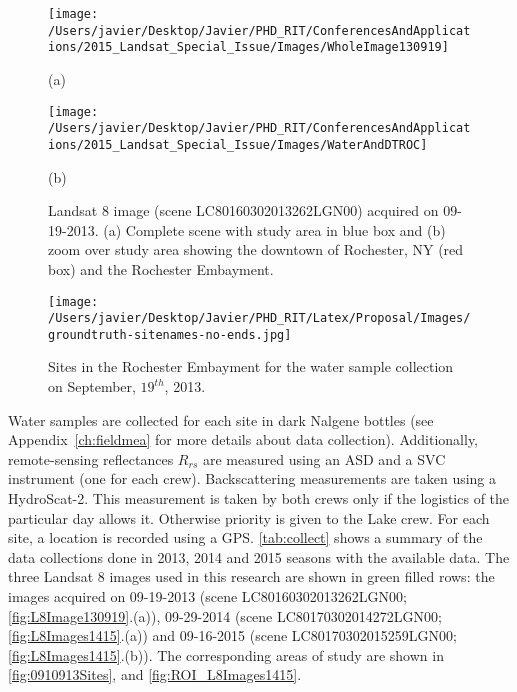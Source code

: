 \begin{figure}[htb!]
    \begin{minipage}[c]{0.48\linewidth}
      \centering
      \texttt{[image: /Users/javier/Desktop/Javier/PHD\_RIT/ConferencesAndApplications/2015\_Landsat\_Special\_Issue/Images/WholeImage130919]}
      \centerline{(a)}\medskip
    \end{minipage}
    \hfill
    \begin{minipage}[d]{0.48\linewidth}
      \centering
      \texttt{[image: /Users/javier/Desktop/Javier/PHD\_RIT/ConferencesAndApplications/2015\_Landsat\_Special\_Issue/Images/WaterAndDTROC]}
      \centerline{(b)}\medskip
    \end{minipage}  
    \caption{Landsat 8 image (scene LC80160302013262LGN00) acquired on 09-19-2013. (a) Complete scene with study area in blue box and (b) zoom over study area showing the downtown of Rochester, NY (red box) and the Rochester Embayment. \label{fig:L8Image130919} }
\end{figure}

\begin{figure}[htb]
  \centering
  \texttt{[image: /Users/javier/Desktop/Javier/PHD\_RIT/Latex/Proposal/Images/groundtruth-sitenames-no-ends.jpg]}
  \caption{Sites in the Rochester Embayment for the water sample collection on September, $19^{th}$, 2013.\label{fig:0910913Sites} } 
\end{figure}

Water samples are collected for each site in dark Nalgene bottles (see Appendix~\ref{ch:fieldmea} for more details about data collection). Additionally, remote-sensing reflectances $R_{rs}$ are measured using an ASD and a SVC instrument (one for each crew). Backscattering measurements are taken using a HydroScat-2. This measurement is taken by both crews only if the logistics of the particular day allows it. Otherwise priority is given to the Lake crew. For each site, a location is recorded using a GPS. \autoref{tab:collect} shows a summary of the data collections done in 2013, 2014 and 2015 seasons with the available data.  The three Landsat 8 images used in this research are shown in green filled rows: the images acquired on 09-19-2013 (scene LC80160302013262LGN00; \autoref{fig:L8Image130919}.(a)), 09-29-2014 (scene LC80170302014272LGN00; \autoref{fig:L8Images1415}.(a)) and 09-16-2015 (scene LC80170302015259LGN00; \autoref{fig:L8Images1415}.(b)). The corresponding areas of study are shown in \autoref{fig:0910913Sites}, and \autoref{fig:ROI_L8Images1415}.

